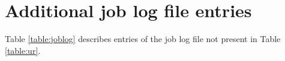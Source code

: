 \documentclass{article}                            %
\begin{document}




\section{Additional job log file entries}
Table \ref{table:joblog} describes entries of the job log file not
present in Table \ref{table:ur}.


\end{document}
